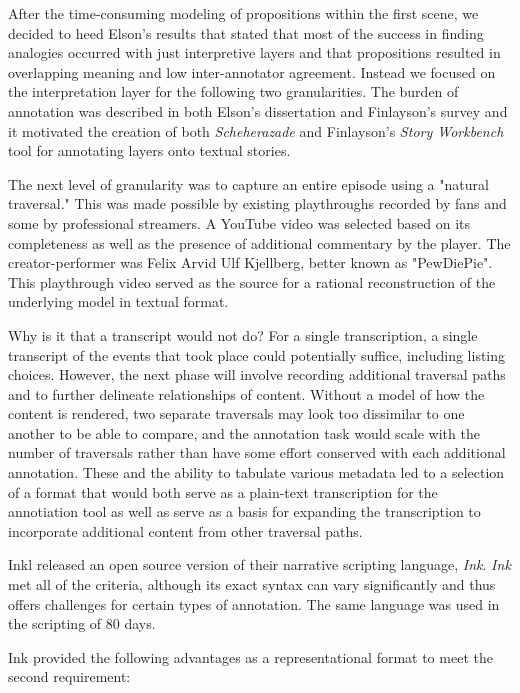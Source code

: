 After the time-consuming modeling of propositions within the first
scene, we decided to heed Elson's results that stated that most of the
success in finding analogies occurred with just interpretive layers
and that propositions resulted in overlapping meaning and low
inter-annotator agreement\cite{Elson2012}. Instead we focused on the
interpretation layer for the following two granularities. The burden
of annotation was described in both Elson's dissertation and
Finlayson's survey and it motivated the creation of both \emph{Scheherazade}
and Finlayson's \emph{Story Workbench} tool for annotating layers onto
textual stories\cite{Finlayson2011}.

The next level of granularity was to capture an entire episode using a
"natural traversal." This was made possible by existing playthroughs
recorded by fans and some by professional streamers. A YouTube video
was selected \cite{wolfamongusstream} based on its completeness as
well as the presence of additional commentary by the player. The
creator-performer was Felix Arvid Ulf Kjellberg, better known as
"PewDiePie". This playthrough video served as the source for a
rational reconstruction of the underlying model in textual format. 

Why is it that a transcript would not do? For a single transcription,
a single transcript of the events that took place could potentially
suffice, including listing choices. However, the next phase will
involve recording additional traversal paths and to further delineate
relationships of content. Without a model of how the content is
rendered, two separate traversals may look too dissimilar to one
another to be able to compare, and the annotation task would scale
with the number of traversals rather than have some effort conserved
with each additional annotation. These and the ability to tabulate
various metadata led to a selection of a format that would both serve
as a plain-text transcription for the annotiation tool as well as
serve as a basis for expanding the transcription to incorporate
additional content from other traversal paths. 

Inkl released an open source version of their narrative scripting
language, \emph{Ink}. \emph{Ink} met all of the criteria, although its exact syntax can vary
significantly and thus offers challenges for certain types of
annotation. The same language was used in the scripting of 80
days\cite{InklLtd.2014}. 

Ink provided the following advantages as a representational format to
meet the second requirement:

